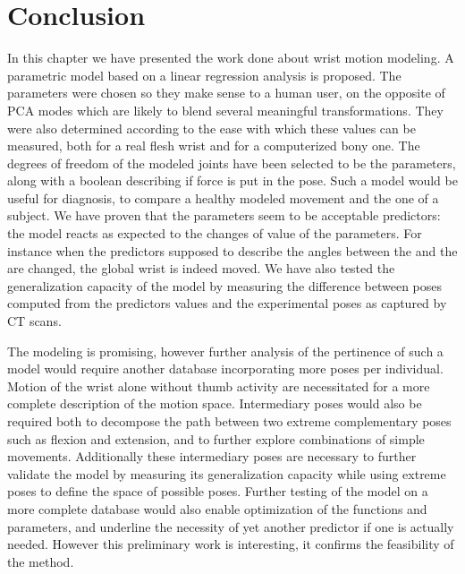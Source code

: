 
\clearpage
\section{Conclusion}
\label{sec:5_Conclusion}

In this chapter we have presented the work done about wrist motion modeling. A parametric model based on a linear regression analysis is proposed. The parameters were chosen so they make sense to a human user, on the opposite of PCA modes which are likely to blend several meaningful transformations. They were also determined according to the ease with which these values can be measured, both for a real flesh wrist and for a computerized bony one. The degrees of freedom of the modeled joints have been selected to be the parameters, along with a boolean describing if force is put in the pose. Such a model would be useful for diagnosis, to compare a healthy modeled movement and the one of a subject. We have proven that the parameters seem to be acceptable predictors: the model reacts as expected to the changes of value of the parameters. For instance when the predictors supposed to describe the angles between the \mct* and the \rad* are changed, the global wrist is indeed moved. We have also tested the generalization capacity of the model by measuring the difference between poses computed from the predictors values and the experimental poses as captured by CT scans. 

The modeling is promising, however further analysis of the pertinence of such a model would require another database incorporating more poses per individual. Motion of the wrist alone without thumb activity are necessitated for a more complete description of the motion space. Intermediary poses would also be required both to decompose the path between two extreme complementary poses such as flexion and extension, and to further explore combinations of simple movements. Additionally these intermediary poses are necessary to further validate the model by measuring its generalization capacity while using extreme poses to define the space of possible poses. Further testing of the model on a more complete database would also enable optimization of the functions and parameters, and underline the necessity of yet another predictor if one is actually needed. However this preliminary work is interesting, it confirms the feasibility of the method. 


